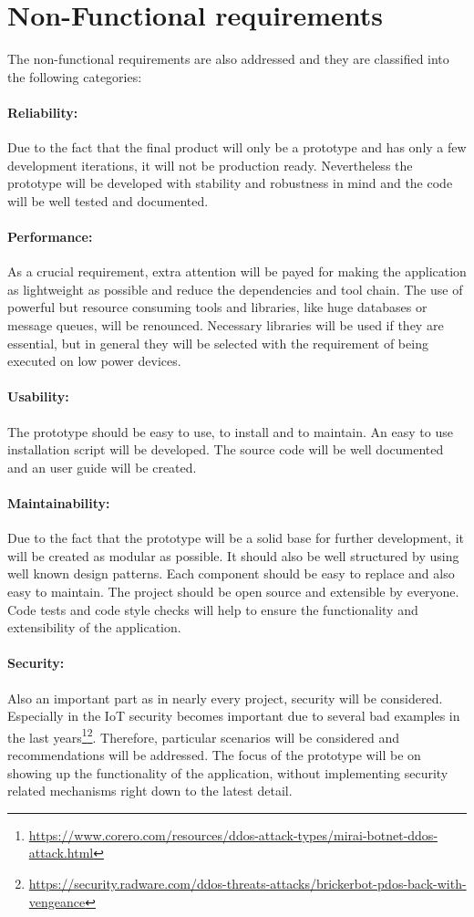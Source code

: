 \section{Non-Functional requirements}
\label{section:non-functional-requirements}
The non-functional requirements are also addressed and they are classified into the following categories:

\paragraph{Reliability:} Due to the fact that the final product will only be a prototype and has only a few development iterations, it will not be production ready. Nevertheless the prototype will be developed with stability and robustness in mind and the code will be well tested and documented.
\paragraph{Performance:} As a crucial requirement, extra attention will be payed for making the application as lightweight as possible and reduce the dependencies and tool chain.
The use of powerful but resource consuming tools and libraries, like huge databases or message queues, will be renounced.
Necessary libraries will be used if they are essential, but in general they will be selected with the requirement of being executed on low power devices.
\paragraph{Usability:} The prototype should be easy to use, to install and to maintain.
An easy to use installation script will be developed.
The source code will be well documented and an user guide will be created.
\paragraph{Maintainability:} Due to the fact that the prototype will be a solid base for further development, it will be created as modular as possible.
It should also be well structured by using well known design patterns.
Each component should be easy to replace and also easy to maintain.
The project should be open source and extensible by everyone.
Code tests and code style checks will help to ensure the functionality and extensibility of the application.
\paragraph{Security:} Also an important part as in nearly every project, security will be considered.
Especially in the \ac{IoT} security becomes important due to several bad examples in the last years\footnote{\url{https://www.corero.com/resources/ddos-attack-types/mirai-botnet-ddos-attack.html}}\footnote{\url{https://security.radware.com/ddos-threats-attacks/brickerbot-pdos-back-with-vengeance}}.
Therefore, particular scenarios will be considered and recommendations will be addressed.
The focus of the prototype will be on showing up the functionality of the application, without implementing security related mechanisms right down to the latest detail.
